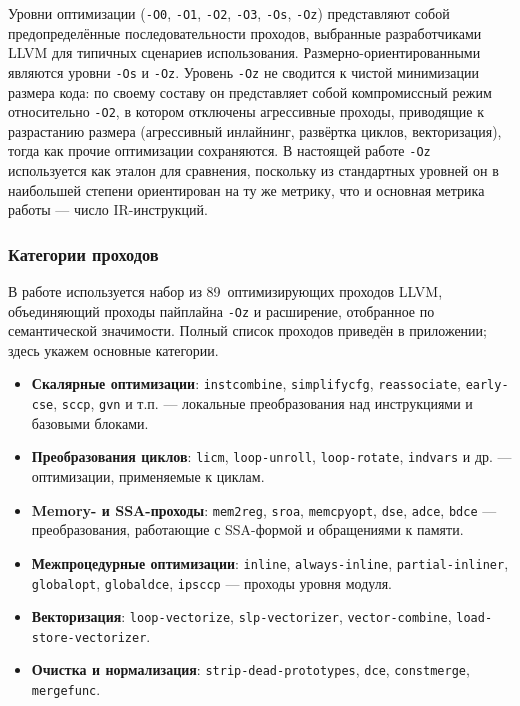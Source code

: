 Уровни оптимизации (\texttt{-O0}, \texttt{-O1}, \texttt{-O2}, \texttt{-O3}, \texttt{-Os}, \texttt{-Oz}) представляют собой предопределённые последовательности проходов, выбранные разработчиками LLVM для типичных сценариев использования. Размерно-ориентированными являются уровни \texttt{-Os} и \texttt{-Oz}. Уровень \texttt{-Oz} не сводится к чистой минимизации размера кода: по своему составу он представляет собой компромиссный режим относительно \texttt{-O2}, в котором отключены агрессивные проходы, приводящие к разрастанию размера (агрессивный инлайнинг, развёртка циклов, векторизация), тогда как прочие оптимизации сохраняются. В настоящей работе \texttt{-Oz} используется как эталон для сравнения, поскольку из стандартных уровней он в наибольшей степени ориентирован на ту же метрику, что и основная метрика работы --- число IR-инструкций.

\subsubsection{Категории проходов}

В работе используется набор из 89~оптимизирующих проходов LLVM, объединяющий проходы пайплайна \texttt{-Oz} и расширение, отобранное по семантической значимости. Полный список проходов приведён в приложении; здесь укажем основные категории.

\begin{itemize}
    \item \textbf{Скалярные оптимизации}: \texttt{instcombine}, \texttt{simplifycfg}, \texttt{reassociate}, \texttt{early-cse}, \texttt{sccp}, \texttt{gvn} и т.п. --- локальные преобразования над инструкциями и базовыми блоками.

    \item \textbf{Преобразования циклов}: \texttt{licm}, \texttt{loop-unroll}, \texttt{loop-rotate}, \texttt{indvars} и др. --- оптимизации, применяемые к циклам.

    \item \textbf{Memory- и SSA-проходы}: \texttt{mem2reg}, \texttt{sroa}, \texttt{memcpyopt}, \texttt{dse}, \texttt{adce}, \texttt{bdce} --- преобразования, работающие с SSA-формой и обращениями к памяти.

    \item \textbf{Межпроцедурные оптимизации}: \texttt{inline}, \texttt{always-inline}, \texttt{partial-inliner}, \texttt{globalopt}, \texttt{globaldce}, \texttt{ipsccp} --- проходы уровня модуля.

    \item \textbf{Векторизация}: \texttt{loop-vectorize}, \texttt{slp-vectorizer}, \texttt{vector-combine}, \texttt{load-store-vectorizer}.

    \item \textbf{Очистка и нормализация}: \texttt{strip-dead-prototypes}, \texttt{dce}, \texttt{constmerge}, \texttt{mergefunc}.
\end{itemize}


